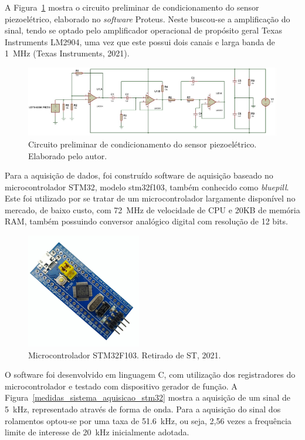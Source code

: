 \documentclass[
	12pt,				
	oneside,			
	a4paper,			
	english,			
	brazil,			
	]{abntex2ppgsi}
\begin{document}
A Figura~\ref{circuito_sensor} mostra o circuito preliminar de condicionamento do sensor piezoelétrico, elaborado no \textit{software} Proteus. Neste buscou-se a amplificação do sinal, tendo se optado pelo amplificador operacional de propósito geral Texas Instruments LM2904, uma vez que este possui dois canais e larga banda de \SI{1}{\mega\hertz} (Texas Instruments, 2021).

\begin{figure}[H]
\centering
\includegraphics[width=\textwidth,height=\textheight,keepaspectratio]{circuito_sensor}
\caption {Circuito preliminar de condicionamento do sensor piezoelétrico. Elaborado pelo autor.}
\label{circuito_sensor}
\end{figure} 

Para a aquisição de dados, foi construído software de aquisição baseado no microcontrolador STM32, modelo stm32f103, também conhecido como \textit{bluepill}. Este foi utilizado por se tratar de um microcontrolador largamente disponível no mercado, de baixo custo, com \SI{72}{\mega\hertz} de velocidade de CPU e 20KB de memória RAM, também possuindo conversor analógico digital com resolução de 12 bits. 

\begin{figure}[H]
\centering
\includegraphics[width=\textwidth,height=50mm,keepaspectratio]{stm32}
\caption {Microcontrolador STM32F103. Retirado de ST, 2021.}
\label{stm32}
\end{figure}

O software foi desenvolvido em linguagem C, com utilização dos registradores do microcontrolador e testado com dispositivo gerador de função. A Figura~\ref{medidas_sistema_aquisicao_stm32} mostra a aquisição de um sinal de \SI{5}{\kilo\hertz}, representado através de forma de onda. Para a aquisição do sinal dos rolamentos optou-se por uma taxa de \SI{51,6}{\kilo\hertz}, ou seja, 2,56 vezes a frequência limite de interesse de \SI{20}{\kilo\hertz} inicialmente adotada. 
\end{document}
